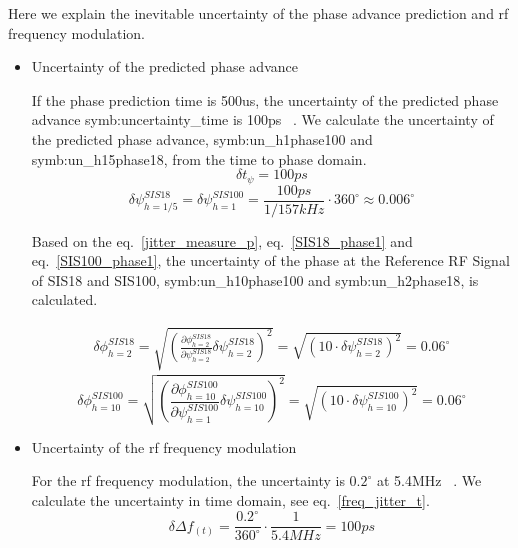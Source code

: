Here we explain the inevitable uncertainty of the phase advance prediction and rf frequency modulation. 
\begin{itemize}
\item Uncertainty of the predicted phase advance

If the phase prediction time is 500us, the uncertainty of the predicted phase advance \gls{symb:uncertainty_time} is 100ps ~\cite{ferrand_development_????}. We calculate the uncertainty of the predicted phase advance, \gls{symb:un_h1phase100} and \gls{symb:un_h15phase18}, from the time to phase domain. 
\begin{equation} 
\delta t_\psi= 100ps
\label{jitter_measure_t}
\end{equation}
\begin{equation} 
\delta \psi_{h=1/5}^{SIS18}=\delta\psi_{h=1}^{SIS100}=
\frac {100ps}{1/157kHz} \cdot {360^{\circ}}\approx 0.006^\circ
\label{jitter_measure_p}
\end{equation}
 
Based on the eq.~\ref{jitter_measure_p}, eq.~\ref{SIS18_phase1} and eq.~\ref{SIS100_phase1}, the uncertainty of the phase at the Reference RF Signal of SIS18 and SIS100,
\gls{symb:un_h10phase100} and \gls{symb:un_h2phase18}, is calculated. 

\begin{equation}
\begin{aligned}
\delta \phi_{h=2}^{SIS18} = \sqrt {(\frac{\partial \phi_{h=2}^{SIS18}}{\partial \psi_{h=2}^{SIS18}} \delta \psi_{h=2}^{SIS18})^2}=\sqrt {(10 \cdot \delta \psi_{h=2}^{SIS18})^2}=0.06^\circ
\label{phi_jitter1}
\end{aligned}
\end{equation}
\begin{equation}
\delta \phi_{h=10}^{SIS100} = \sqrt {(\frac{\partial \phi_{h=10}^{SIS100}}{\partial \psi_{h=1}^{SIS100}} \delta \psi_{h=10}^{SIS100})^2}=\sqrt {(10 \cdot \delta \psi_{h=10}^{SIS100})^2}=0.06^\circ
\label{phi_jitter2}
\end{equation}

\item Uncertainty of the rf frequency modulation

For the rf frequency modulation, the uncertainty is $0.2^\circ$ at 5.4MHz ~\cite{laier_funktional-spezifikation_2011}. We calculate the uncertainty in time domain, see eq.~\ref{freq_jitter_t}.
\begin{equation}
\delta \Delta f_{(t)} = \frac{0.2^\circ}{360^\circ} \cdot {\frac{1}{5.4MHz}}=100ps
\label{freq_jitter_t}
\end{equation}
%



\end{itemize}
